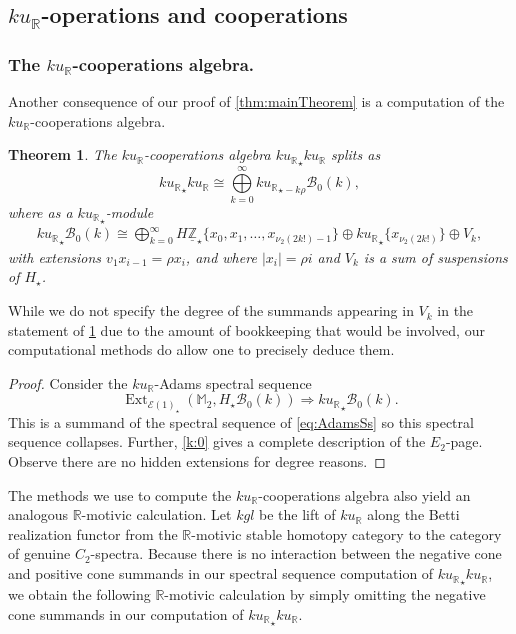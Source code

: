\documentclass{amsart}
\newtheorem{theorem}[equation]{Theorem}
\theoremstyle{plain}
\numberwithin{equation}{section}
\numberwithin{figure}{section}
\DeclareMathOperator{\Ext}{Ext}
\newcommand{\mM}{{\mathbb M}}
\newcommand{\mR}{{\mathbb R}}
\newcommand{\mZ}{{\mathbb Z}}
\newcommand{\cB}{{\mathcal B}}
\newcommand{\cE}{{\mathcal E}}
\newcommand{\umZ}{\underline{\mZ}}
\newcommand{\0}{\langle 0 \rangle }
\begin{document}
\subsection{{$ku_\mR$-operations and cooperations}}

\subsubsection{The $ku_\mR$-cooperations algebra.} Another consequence of our proof of \cref{thm:mainTheorem} is a computation of the $ku_\mR$-cooperations algebra.

\begin{theorem} \label{thm:cooperationsAlg}
    The $ku_\mR$-cooperations algebra ${ku_\mR}_\star ku_\mR$ splits as
    \[
    {ku_\mR}_\star ku_\mR \cong \overset{\infty}{\underset{k=0}{\bigoplus}}  {ku_\mR}_{\star - k \rho} \cB_0(k), 
    \]
    where as a ${ku_\mR}_\star$-module 
    \begin{align*}
        {ku_\mR}_{\star}\cB_{0}(k)
        \cong \bigoplus\limits_{k=0}^{\infty} H \umZ_{\star}\{x_{0}, x_{1}, \ldots, x_{\nu_2(2k!)-1} \} \oplus {ku_\mathbb{R}}_{\star}\{x_{\nu_2(2k!)} \} \oplus V_{k},
    \end{align*}
    with extensions $v_1 x_{i - 1} = \rho x_i$, and where $| x_i | = \rho i$ and $V_k$ is a sum of suspensions of $H_\star$. 
\end{theorem}

While we do not specify the degree of the summands appearing in $V_k$ in the statement of \cref{thm:cooperationsAlg} due to the amount of bookkeeping that would be involved, our computational methods do allow one to precisely deduce them.

\begin{proof}
    Consider the $ku_{\mR}$-Adams spectral sequence
\[\Ext_{\cE(1)_{\star}}(\mM_{2}, H_{\star}\cB_{0}(k))\Longrightarrow {ku_\mR}_\star \cB_{0}(k). \]
This is a summand of the spectral sequence of \cref{eq:AdamsSs} so this spectral sequence collapses. Further, \cref{k:0} gives a complete description of the $E_{2}$-page. Observe there are no hidden extensions for degree reasons.  
\end{proof}

The methods we use to compute the $ku_\mR$-cooperations algebra also yield an analogous $\mR$-motivic calculation. Let $kgl$ be the lift of $ku_\mR$ along the Betti realization functor from the $\mR$-motivic stable homotopy category to the category of genuine $C_2$-spectra. Because there is no interaction between the negative cone and positive cone summands in our spectral sequence computation of ${ku_\mR}_\star ku_{\mR}$, we obtain the following $\mR$-motivic calculation by simply omitting the negative cone summands in our computation of ${ku_\mR}_\star ku_\mR.$
\end{document}
